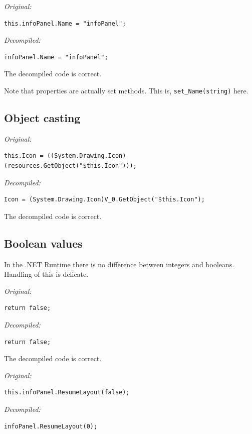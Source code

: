 \documentclass[12pt,twoside,notitlepage]{report}
\begin{document}
\emph{Original:}
\begin{verbatim}
this.infoPanel.Name = "infoPanel";
\end{verbatim}

\emph{Decompiled:}
\begin{verbatim}
infoPanel.Name = "infoPanel";
\end{verbatim}

The decompiled code is correct.

Note that properties are actually set methods.  This is,
\verb|set_Name(string)| here. 


\subsection{Object casting}

\emph{Original:}
\begin{verbatim}
this.Icon = ((System.Drawing.Icon)(resources.GetObject("$this.Icon")));
\end{verbatim}

\emph{Decompiled:}
\begin{verbatim}
Icon = (System.Drawing.Icon)V_0.GetObject("$this.Icon");
\end{verbatim}

The decompiled code is correct.



\subsection{Boolean values}

In the .NET Runtime there is no difference between
integers and booleans.  Handling of this is delicate.

\emph{Original:}
\begin{verbatim}
return false;
\end{verbatim}

\emph{Decompiled:}
\begin{verbatim}
return false;
\end{verbatim}

The decompiled code is correct.

\emph{Original:}
\begin{verbatim}
this.infoPanel.ResumeLayout(false);
\end{verbatim}

\emph{Decompiled:}
\begin{verbatim}
infoPanel.ResumeLayout(0);
\end{verbatim}
\end{document}
